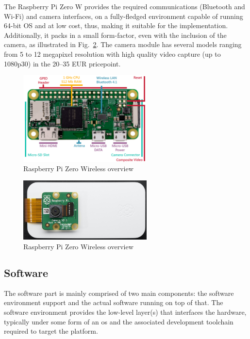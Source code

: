 The Raspberry Pi Zero W provides the required communications
(Bluetooth and Wi-Fi) and camera interfaces, on a fully-fledged environment
capable of running 64-bit OS and at low cost, thus, making it
suitable for the implementation. Additionally, it packs in a small form-factor,
even with the inclusion of the camera, as illustrated in
Fig.~\ref{fig:pi-zero-w-cam}. The camera module has several models ranging from
5 to 12 megapixel resolution with high quality video capture (up to 1080p30) in
the 20--35 EUR pricepoint.
%
\begin{figure}[!hbt]
\centering
    \includegraphics[width=0.6\textwidth]{./img/pi-zero-w.png}
  \caption{Raspberry Pi Zero Wireless overview}%
\label{fig:pi-zero-w}
\end{figure}
\begin{figure}[!hbt]
\centering
    \includegraphics[width=0.6\textwidth]{./img/pi-zero-w-cam.jpg}
  \caption{Raspberry Pi Zero Wireless overview}%
\label{fig:pi-zero-w-cam}
\end{figure}
%

\subsection{Software}%
\label{sec:software-rvvs-implem}
The software part is mainly comprised of two main components: the software
environment support and the actual software running on top of that. The software
environment provides the low-level layer(s) that interfaces the hardware,
typically under some form of an \gls{os} and the associated development
toolchain required to target the platform.

